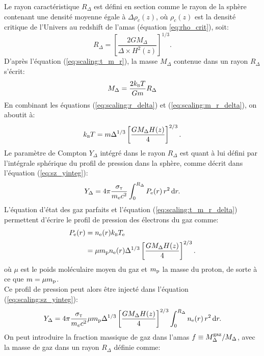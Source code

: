 Le rayon caractéristique $R_\Delta$ est défini en section  comme le rayon de la sphère contenant une densité moyenne égale à $\Delta \rho_c(z)$, où $\rho_c(z)$ est la densité critique de l'Univers au redshift de l'amas (équation \ref{eq:rho_crit}), soit:
\begin{equation}
    \label{eq:scaling:r_delta}
    R_\Delta = \left[ \frac{2GM_\Delta}{\Delta \times H^2(z)} \right]^{1/3}.
\end{equation}
D'après l'équation (\ref{eq:scaling:t_m_r}), la masse $M_\Delta$ contenue dans un rayon $R_\Delta$ s'écrit:
\begin{equation}
    \label{eq:scaling:m_r_delta}
    M_\Delta = \frac{2 k_\textsc{b} T}{Gm} R_\Delta
\end{equation}
En combinant les équations (\ref{eq:scaling:r_delta}) et (\ref{eq:scaling:m_r_delta}), on aboutit à:
\begin{equation}
    \label{eq:scaling:t_m_r_delta}
    k_\textsc{b} T = m \Delta^{1/3} \left[\frac{G M_\Delta H(z)}{4}\right]^{2/3}.
\end{equation}
Le paramètre de Compton $Y_\Delta$ intégré dans le rayon $R_\Delta$ est quant à lui défini par l'intégrale sphérique du profil de pression dans la sphère, comme décrit dans l'équation (\ref{eq:sz_yinteg}):
\begin{equation}
    \label{eq:scaling:sz_yinteg}
    Y_\Delta = 4\pi \frac{\sigma_\textsc{t}}{m_{\rm e} c^2} \int_0^{R_\Delta} P_{\rm e}(r) \, r^2 \, \mathrm{d} r.
\end{equation}
L'équation d'état des gaz parfaits et l'équation (\ref{eq:scaling:t_m_r_delta}) permettent d'écrire le profil de pression des électrons du gaz comme:
\begin{align}
    \nonumber P_{\rm e}(r) &= n_{\rm e}(r) k_\textsc{b} T_{\rm e} \\
              &= \mu m_{\rm p} n_{\rm e}(r) \Delta^{1/3} \left[\frac{G M_\Delta H(z)}{4}\right]^{2/3}.
\end{align}
où $\mu$ est le poids moléculaire moyen du gaz et $m_{\rm p}$ la masse du proton, de sorte à ce que $m = \mu m_{\rm p}$. \\
Ce profil de pression peut alors être injecté dans l'équation (\ref{eq:scaling:sz_yinteg}):
\begin{equation}
    Y_\Delta = 4\pi \frac{\sigma_\textsc{t}}{m_e c^2} \mu m_{\rm p} \Delta^{1/3} \left[\frac{G M_\Delta H(z)}{4}\right]^{2/3} \int_0^{R_\Delta} n_{\rm e}(r) \, r^2 \, \mathrm{d} r.
\end{equation}
On peut introduire la fraction massique de gaz dans l'amas $f \equiv M_\Delta^{\rm gaz} / M_\Delta$, avec la masse de gaz dans un rayon $R_\Delta$ définie comme:
